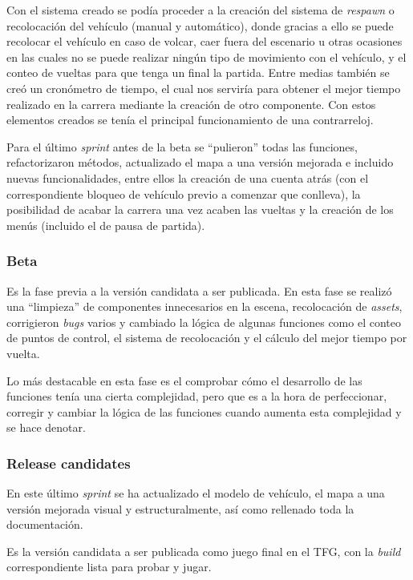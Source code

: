 Con el sistema creado se podía proceder a la creación del sistema de \textit{respawn} o recolocación del vehículo (manual y automático), donde gracias a ello se puede recolocar el vehículo en caso de volcar, caer fuera del escenario u otras ocasiones en las cuales no se puede realizar ningún tipo de movimiento con el vehículo, y el conteo de vueltas para que tenga un final la partida. Entre medias también se creó un cronómetro de tiempo, el cual nos serviría para obtener el mejor tiempo realizado en la carrera mediante la creación de otro componente. Con estos elementos creados se tenía el principal funcionamiento de una contrarreloj.

Para el último \textit{sprint} antes de la beta se ``pulieron'' todas las funciones, refactorizaron métodos, actualizado el mapa a una versión mejorada e incluido nuevas funcionalidades, entre ellos la creación de una cuenta atrás (con el correspondiente bloqueo de vehículo previo a comenzar que conlleva), la posibilidad de acabar la carrera una vez acaben las vueltas y la creación de los menús (incluido el de pausa de partida).

\subsubsection{Beta}

Es la fase previa a la versión candidata a ser publicada. En esta fase se realizó una ``limpieza'' de componentes innecesarios en la escena, recolocación de \textit{assets}, corrigieron \textit{bugs} varios y cambiado la lógica de algunas funciones como el conteo de puntos de control, el sistema de recolocación y el cálculo del mejor tiempo por vuelta.

Lo más destacable en esta fase es el comprobar cómo el desarrollo de las funciones tenía una cierta complejidad, pero que es a la hora de perfeccionar, corregir y cambiar la lógica de las funciones cuando aumenta esta complejidad y se hace denotar.

\subsubsection{Release candidates}

En este último \textit{sprint} se ha actualizado el modelo de vehículo, el mapa a una versión mejorada visual y estructuralmente, así como rellenado toda la documentación.

Es la versión candidata a ser publicada como juego final en el TFG, con la \textit{build} correspondiente lista para probar y jugar.

